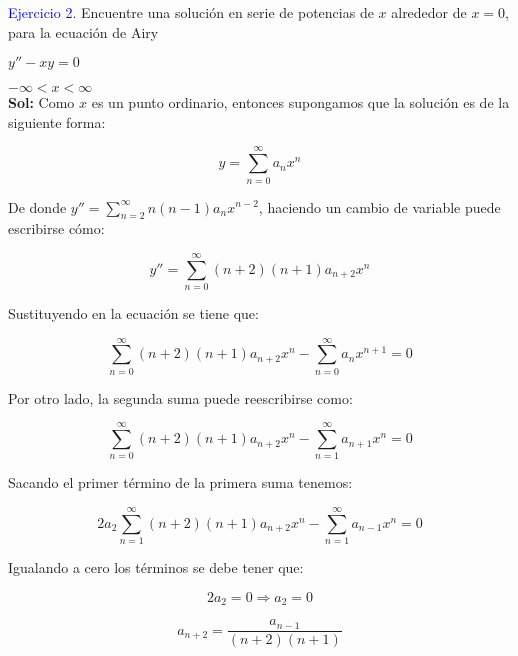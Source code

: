 \textcolor{blue}{Ejercicio 2.} Encuentre una solución en serie de potencias de $x$ alrededor de $x=0$, para la ecuación de Airy 

\begin{center}
    $y''-xy=0$
\end{center}

$- \infty < x < \infty $\\

\textbf{Sol:} Como $x$ es un punto ordinario, entonces supongamos que la solución es de la siguiente forma: 

\begin{equation*}
    y= \sum_{n=0}^{\infty} a_n x^n
\end{equation*}

De donde $y''= \displaystyle\sum_{n=2}^{\infty} n(n-1) a_n x^{n-2}$, haciendo un cambio de variable puede escribirse cómo:

\begin{equation*}
    y''= \displaystyle\sum_{n=0}^{\infty} (n+2)(n+1) a_{n+2} x^{n}
\end{equation*}

Sustituyendo en la ecuación se tiene que:

\begin{equation*}
    \displaystyle\sum_{n=0}^{\infty} (n+2)(n+1) a_{n+2} x^n - \displaystyle\sum_{n=0}^{\infty} a_n x^{n+1}=0
\end{equation*}

Por otro lado, la segunda suma puede reescribirse como: 

\begin{equation*}
    \displaystyle\sum_{n=0}^{\infty} (n+2)(n+1) a_{n+2} x^{n}- \displaystyle\sum_{n=1}^{\infty} a_{n+1} x^n =0
\end{equation*}

Sacando el primer término de la primera suma tenemos: 

\begin{equation*}
    2a_2 \displaystyle\sum_{n=1}^{\infty} (n+2)(n+1) a_{n+2} x^n - \displaystyle\sum_{n=1}^{\infty} a_{n-1} x^n=0
\end{equation*}

Igualando a cero los términos se debe tener que: 

\begin{equation*}
    2a_2=0 \Rightarrow a_2=0
\end{equation*}

\begin{equation*}
    a_{n+2}=\frac{a_{n-1}}{(n+2)(n+1)}
\end{equation*}

